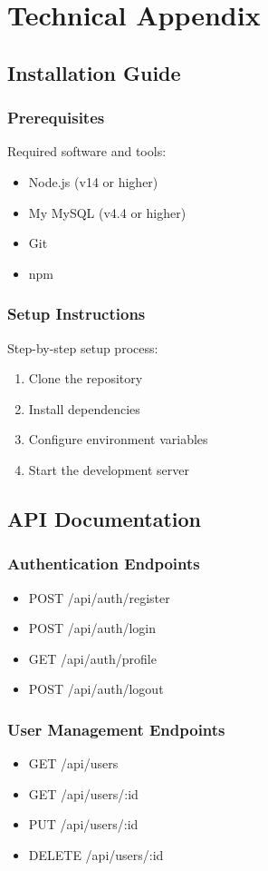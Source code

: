 \chapter{Technical Appendix}
\label{app:technical}

\section{Installation Guide}
\subsection{Prerequisites}
Required software and tools:
\begin{itemize}
    \item Node.js (v14 or higher)
    \item My MySQL (v4.4 or higher)
    \item Git
    \item npm
\end{itemize}

\subsection{Setup Instructions}
Step-by-step setup process:
\begin{enumerate}
    \item Clone the repository
    \item Install dependencies
    \item Configure environment variables
    \item Start the development server
\end{enumerate}

\section{API Documentation}
\subsection{Authentication Endpoints}
\begin{itemize}
    \item POST /api/auth/register
    \item POST /api/auth/login
    \item GET /api/auth/profile
    \item POST /api/auth/logout
\end{itemize}

\subsection{User Management Endpoints}
\begin{itemize}
    \item GET /api/users
    \item GET /api/users/:id
    \item PUT /api/users/:id
    \item DELETE /api/users/:id
\end{itemize}


